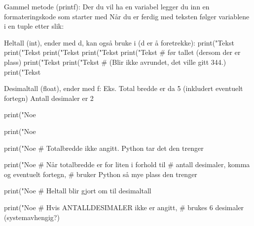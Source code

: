Gammel metode (printf):
Der du vil ha en variabel legger du inn en formateringskode som starter 
med %
Når du er ferdig med teksten følger variablene i en tuple etter %
slik: %


Heltall (int), ender med d, kan også bruke i (d er å foretrekke):
print("Tekst %
print("Tekst %
print("Tekst %
print("Tekst %
print("Tekst %
                                   # før tallet (dersom der er plass) 
print("Tekst %
print("Tekst %
                                   # (Blir ikke avrundet, det ville gitt 344.)  
print("Tekst %


Desimaltall (float), ender med f:  %
Eks. %
  Total bredde er da 5 (inkludert eventuelt fortegn)
  Antall desimaler er 2

print("Noe %

print("Noe %

print("Noe %
                                     # Totalbredde ikke angitt. Python tar det den trenger

print("Noe %
                                     # Når totalbredde er for liten i forhold til 
                                     # antall desimaler, komma og eventuelt fortegn, 
                                     # bruker Python så mye plass den trenger

print("Noe %
                                     # Heltall blir gjort om til desimaltall

print("Noe %
                                     # Hvis ANTALLDESIMALER ikke er angitt, 
                                     # brukes 6 desimaler (systemavhengig?) 

